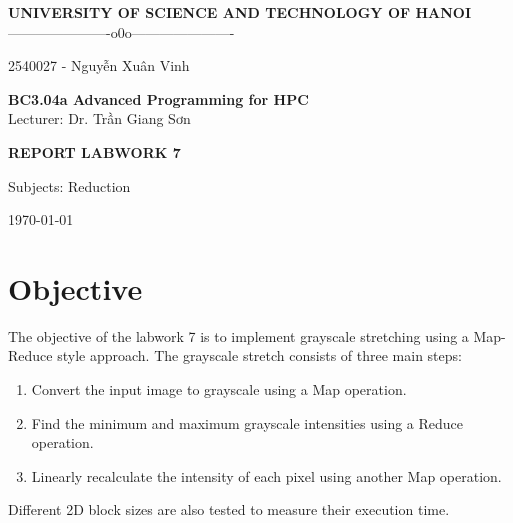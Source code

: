\documentclass[11pt]{article}
\begin{document}
\begin{center}

{\Large \textbf{UNIVERSITY OF SCIENCE AND TECHNOLOGY OF HANOI}}\\
\vspace{0.3cm}
----------------------o0o----------------------\\

\vspace{4cm}

{\large
\centerline{2540027 - Nguyễn Xuân Vinh}
}

\vspace{4cm}

{\Huge \textbf{BC3.04a Advanced Programming for HPC}}\\
\vspace{0.5cm}
Lecturer: Dr. Trần Giang Sơn

\vspace{4cm}

{\Large \textbf{REPORT LABWORK 7}}\\

\vspace{0.5cm}

{\large
Subjects: Reduction
}

\vspace{4cm}
\today
\end{center}

\newpage

\newpage

\tableofcontents

\newpage

\section{Objective}

The objective of the labwork 7 is to implement grayscale stretching using a Map-Reduce style approach. The grayscale stretch consists of three main steps:

\begin{enumerate}
\item Convert the input image to grayscale using a Map operation.
\item Find the minimum and maximum grayscale intensities using a Reduce operation.
\item Linearly recalculate the intensity of each pixel using another Map operation.
\end{enumerate}

Different 2D block sizes are also tested to measure their execution time.
\end{document}
